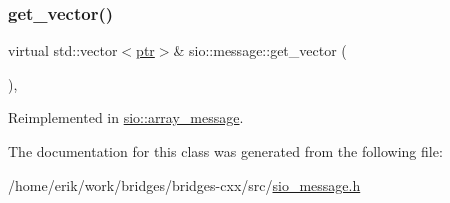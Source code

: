 \subsubsection{\texorpdfstring{get\+\_\+vector()}{get\_vector()}\hspace{0.1cm}{\footnotesize\ttfamily [2/2]}}
{\footnotesize\ttfamily virtual std\+::vector$<$\hyperlink{classsio_1_1message_a6340b6fef57e4516eb17928b1885a615}{ptr}$>$\& sio\+::message\+::get\+\_\+vector (\begin{DoxyParamCaption}{ }\end{DoxyParamCaption})\hspace{0.3cm}{\ttfamily [inline]}, {\ttfamily [virtual]}}



Reimplemented in \hyperlink{classsio_1_1array__message_a7d039c4e78bb01f5e19921e0f09509c2}{sio\+::array\+\_\+message}.



The documentation for this class was generated from the following file\+:\begin{DoxyCompactItemize}
\item 
/home/erik/work/bridges/bridges-\/cxx/src/\hyperlink{sio__message_8h}{sio\+\_\+message.\+h}\end{DoxyCompactItemize}
